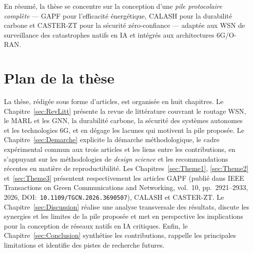 En résumé, la thèse se concentre sur la conception d'une \emph{pile protocolaire complète} — GAPF pour l'efficacité énergétique, CALASH pour la durabilité carbone et CASTER-ZT pour la sécurité zéro-confiance — adaptée aux WSN de surveillance des catastrophes natifs en IA et intégrés aux architectures 6G/O-RAN.

\section{Plan de la thèse}\label{sec:Plan}

La thèse, rédigée sous forme d'articles, est organisée en huit chapitres. Le Chapitre~\ref{sec:RevLitt} présente la revue de littérature couvrant le routage WSN, le MARL et les GNN, la durabilité carbone, la sécurité des systèmes autonomes et les technologies 6G, et en dégage les lacunes qui motivent la pile proposée\cite{chong2003sensor,freitag2021ict,saad2020vision6g,polese2023oran,metaheuristic_wsn_slr2026}. Le Chapitre~\ref{sec:Demarche} explicite la démarche méthodologique, le cadre expérimental commun aux trois articles et les liens entre les contributions, en s'appuyant sur les méthodologies de \emph{design science} et les recommandations récentes en matière de reproductibilité\cite{Hevner2004DesignScience,Peffers2007DSRM,Pineau2021Reproducibility}. Les Chapitres~\ref{sec:Theme1}, \ref{sec:Theme2} et~\ref{sec:Theme3} présentent respectivement les articles GAPF (publié dans IEEE Transactions on Green Communications and Networking, vol.~10, pp.~2921--2933, 2026, DOI:~\texttt{10.1109/TGCN.2026.\allowbreak{}3690507})\cite{gapf_tgcn2026}, CALASH et CASTER-ZT. Le Chapitre~\ref{sec:Discussion} réalise une analyse transversale des résultats, discute les synergies et les limites de la pile proposée et met en perspective les implications pour la conception de réseaux natifs en IA critiques. Enfin, le Chapitre~\ref{sec:Conclusion} synthétise les contributions, rappelle les principales limitations et identifie des pistes de recherche futures.
